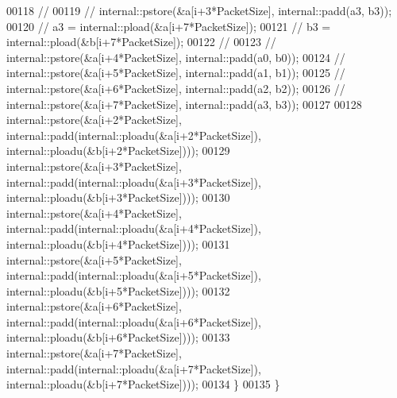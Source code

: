 \begin{DoxyCode}
00118 \textcolor{comment}{//             }
00119 \textcolor{comment}{//             internal::pstore(&a[i+3*PacketSize], internal::padd(a3, b3));}
00120 \textcolor{comment}{//             a3 = internal::pload(&a[i+7*PacketSize]);}
00121 \textcolor{comment}{//             b3 = internal::pload(&b[i+7*PacketSize]);}
00122 \textcolor{comment}{//             }
00123 \textcolor{comment}{//             internal::pstore(&a[i+4*PacketSize], internal::padd(a0, b0));}
00124 \textcolor{comment}{//             internal::pstore(&a[i+5*PacketSize], internal::padd(a1, b1));}
00125 \textcolor{comment}{//             internal::pstore(&a[i+6*PacketSize], internal::padd(a2, b2));}
00126 \textcolor{comment}{//             internal::pstore(&a[i+7*PacketSize], internal::padd(a3, b3));}
00127             
00128             internal::pstore(&a[i+2*PacketSize], internal::padd(internal::ploadu(&a[i+2*PacketSize]), 
      internal::ploadu(&b[i+2*PacketSize])));
00129             internal::pstore(&a[i+3*PacketSize], internal::padd(internal::ploadu(&a[i+3*PacketSize]), 
      internal::ploadu(&b[i+3*PacketSize])));
00130             internal::pstore(&a[i+4*PacketSize], internal::padd(internal::ploadu(&a[i+4*PacketSize]), 
      internal::ploadu(&b[i+4*PacketSize])));
00131             internal::pstore(&a[i+5*PacketSize], internal::padd(internal::ploadu(&a[i+5*PacketSize]), 
      internal::ploadu(&b[i+5*PacketSize])));
00132             internal::pstore(&a[i+6*PacketSize], internal::padd(internal::ploadu(&a[i+6*PacketSize]), 
      internal::ploadu(&b[i+6*PacketSize])));
00133             internal::pstore(&a[i+7*PacketSize], internal::padd(internal::ploadu(&a[i+7*PacketSize]), 
      internal::ploadu(&b[i+7*PacketSize])));
00134         \}
00135 \}
\end{DoxyCode}
